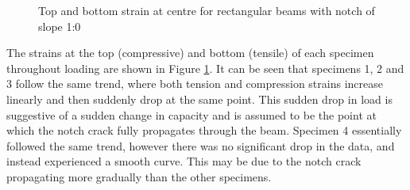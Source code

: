 \documentclass[11pt,a4paper]{article}
\numberwithin{equation}{subsection}
\begin{document}
\begin{figure}[h]
	\begin{center}
	\end{center}
	\caption{Top and bottom strain at centre for rectangular beams with notch of slope 1:0}
	\label{fig:Rect_10_centre}
\end{figure}

\pagebreak

\noindent
The strains at the top (compressive) and bottom (tensile) of each specimen throughout loading are shown in Figure \ref{fig:Rect_10_centre}. It can be seen that specimens 1, 2 and 3 follow the same trend, where both tension and compression strains increase linearly and then suddenly drop at the same point. This sudden drop in load is suggestive of a sudden change in capacity and is assumed to be the point at which the notch crack fully propagates through the beam. Specimen 4 essentially followed the same trend, however there was no significant drop in the data, and instead experienced a smooth curve. This may be due to the notch crack propagating more gradually than the other specimens. 
  
\vspace*{\baselineskip}
\end{document}
